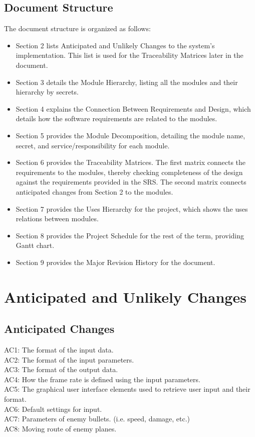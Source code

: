 \documentclass[12,english]{article}
\begin{document}
	\subsection{Document Structure}
	{\color{red}The document structure is organized as follows}:
\begin{itemize}

\item {\color{red}Section 2 lists Anticipated and Unlikely Changes to the system's implementation. This list is used for the Traceability Matrices later in the document.}

\item Section 3 details the Module Hierarchy, listing all the modules and their hierarchy by secrets. 

\item Section 4 explains the Connection Between Requirements and Design, which details how the software requirements are related to the modules. 

\item Section 5 provides the Module Decomposition, detailing the module name, secret, and service/responsibility for each module. 

\item Section 6 provides the Traceability Matrices. The first matrix connects the requirements to the modules, thereby checking completeness of the design against the requirements provided in the SRS. The second matrix connects anticipated changes from Section 2 to the modules.

\item Section 7 provides the Uses Hierarchy for the project, which shows the uses relations between modules.

\item Section 8 provides the Project Schedule for the rest of the term, providing Gantt chart.
\item Section 9 provides the Major Revision History for the document.
\end{itemize}	

\section{Anticipated and Unlikely Changes}

\subsection{Anticipated Changes}

AC1: The format of the input data.\\
AC2: The format of the input parameters.\\
AC3: The format of the output data.\\
AC4: How the frame rate is defined using the input parameters.\\
AC5: The graphical user interface elements used to retrieve user input and their format.\\
AC6: Default settings for input.\\
AC7: Parameters of enemy bullets. (i.e. speed, damage, etc.)\\
AC8: Moving route of enemy planes.
\end{document}
